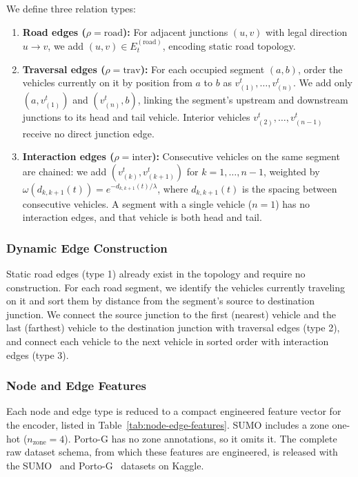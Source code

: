 \documentclass[pdflatex,sn-basic,Numbered]{sn-jnl}%
\begin{document}
We define three relation types:
\begin{enumerate}
    \item \textbf{Road edges ($\rho=\text{road}$):} For adjacent junctions $(u,v)$ with legal direction $u\!\to\!v$, we add $(u,v)\in E_t^{(\text{road})}$, encoding static road topology.
    \item \textbf{Traversal edges ($\rho=\text{trav}$):} For each occupied segment $(a,b)$, order the vehicles currently on it by position from $a$ to $b$ as $v_{(1)}^t,\dots,v_{(n)}^t$. We add only $(a, v_{(1)}^t)$ and $(v_{(n)}^t, b)$, linking the segment's upstream and downstream junctions to its head and tail vehicle. Interior vehicles $v_{(2)}^t,\dots,v_{(n-1)}^t$ receive no direct junction edge.
    \item \textbf{Interaction edges ($\rho=\text{inter}$):} Consecutive vehicles on the same segment are chained: we add $(v_{(k)}^t, v_{(k+1)}^t)$ for $k=1,\dots,n-1$, weighted by $\omega(d_{k,k+1}(t)) = e^{-d_{k,k+1}(t)/\lambda}$, where $d_{k,k+1}(t)$ is the spacing between consecutive vehicles. A segment with a single vehicle ($n{=}1$) has no interaction edges, and that vehicle is both head and tail.
\end{enumerate}

\subsubsection{Dynamic Edge Construction}
Static road edges (type 1) already exist in the topology and require no construction. For each road segment, we identify the vehicles currently traveling on it and sort them by distance from the segment's source to destination junction. We connect the source junction to the first (nearest) vehicle and the last (farthest) vehicle to the destination junction with traversal edges (type 2), and connect each vehicle to the next vehicle in sorted order with interaction edges (type 3).

\subsubsection{Node and Edge Features}
Each node and edge type is reduced to a compact engineered feature vector for the encoder, listed in Table~\ref{tab:node-edge-features}. SUMO includes a zone one-hot ($n_{\mathrm{zone}}{=}4$). Porto-G has no zone annotations, so it omits it. The complete raw dataset schema, from which these features are engineered, is released with the SUMO~\cite{tordjman2026sumokaggle} and Porto-G~\cite{tordjman2026portokaggle} datasets on Kaggle.
\end{document}
